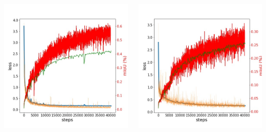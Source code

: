 \documentclass{beamer}
\begin{document}
\begin{frame}
\begin{columns}
\begin{center}
\includegraphics[scale=0.22]{seg_res_1.jpg}
\end{center}
\begin{center}
\includegraphics[scale=0.22]{seg_res_2.jpg}
\end{center}
\end{columns}

\end{frame}
\end{document}

